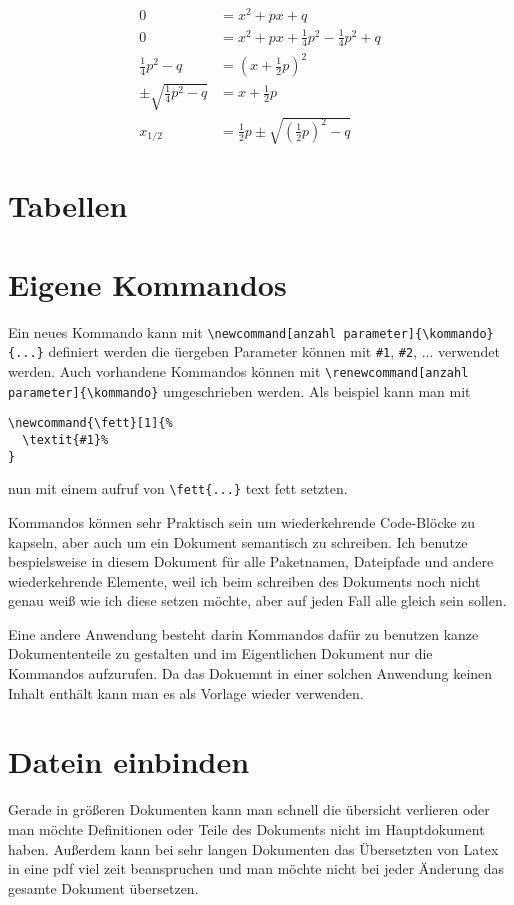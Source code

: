 \documentclass[a4paper, parskip=half]{scrartcl}
\begin{document}
\begin{align}
  0                  &= x^2 + px + q \\
  0                  &= x^2 + px + \frac{1}{4}p^2 - \frac{1}{4}p^2 + q \\
  \frac{1}{4}p^2 - q &= \left(x + \frac{1}{2}p \right)^2 \\
  \pm \sqrt{ \frac{1}{4}p^2 - q} &= x + \frac{1}{2}p \\
  x_{1/2}            &= \frac{1}{2}p \pm \sqrt{\left(\frac{1}{2}p\right)^2 - q}  
\end{align}

\section{Tabellen}

\section{Eigene Kommandos}\label{sec:customCommands}
Ein neues Kommando kann mit \verb+\newcommand[anzahl parameter]{\kommando}{...}+ definiert werden
die üergeben Parameter können mit \verb+#1+, \verb+#2+, ... verwendet werden. Auch vorhandene Kommandos
können mit \verb+\renewcommand[anzahl parameter]{\kommando}+ umgeschrieben werden. Als beispiel kann man mit
\begin{verbatim}
\newcommand{\fett}[1]{%
  \textit{#1}%
}
\end{verbatim}
nun mit einem aufruf von \verb+\fett{...}+ text fett setzten.

Kommandos können sehr Praktisch sein um wiederkehrende Code-Blöcke zu kapseln, aber auch um ein Dokument
semantisch zu schreiben. Ich benutze bespielsweise in diesem Dokument für alle Paketnamen, Dateipfade und
andere wiederkehrende Elemente, weil ich beim schreiben des Dokuments noch nicht genau weiß wie ich diese
setzen möchte, aber auf jeden Fall alle gleich sein sollen. 

Eine andere Anwendung besteht darin Kommandos dafür zu benutzen kanze Dokumententeile zu gestalten und im
Eigentlichen Dokument nur die Kommandos aufzurufen. Da das Dokuemnt in einer solchen Anwendung keinen Inhalt
enthält kann man es als Vorlage wieder verwenden. 

\section{Datein einbinden}
Gerade in größeren Dokumenten kann man schnell die übersicht verlieren oder man möchte Definitionen oder
Teile des Dokuments nicht im Hauptdokument haben. Außerdem kann bei sehr langen Dokumenten das Übersetzten
von Latex in eine pdf viel zeit beanspruchen und man möchte nicht bei jeder Änderung das gesamte Dokument
übersetzen. 
\end{document}
